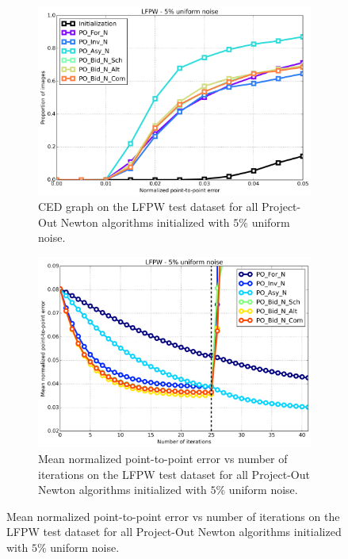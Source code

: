 \begin{figure}[p]
	\centering
	\begin{subfigure}{0.48\textwidth}
	    \includegraphics[width=\textwidth]{experiments/algorithms/po_n/ced_po_n_5.png}
	    \caption{CED graph on the LFPW test dataset for all Project-Out Newton algorithms initialized with $5\%$ uniform noise.}
	    \label{fig:ced_bpo_n_5}
	\end{subfigure}
	\hfill
	\begin{subfigure}{0.48\textwidth}
	    \includegraphics[width=\textwidth]{experiments/algorithms/po_n/mean_error_vs_iters_po_n_5.png}
	    \caption{Mean normalized point-to-point error vs number of iterations on the LFPW test dataset for all Project-Out Newton algorithms initialized with $5\%$ uniform noise.}
	    \label{fig:mean_error_vs_iters_bpo_n_5}
	\end{subfigure}

\end{figure}
